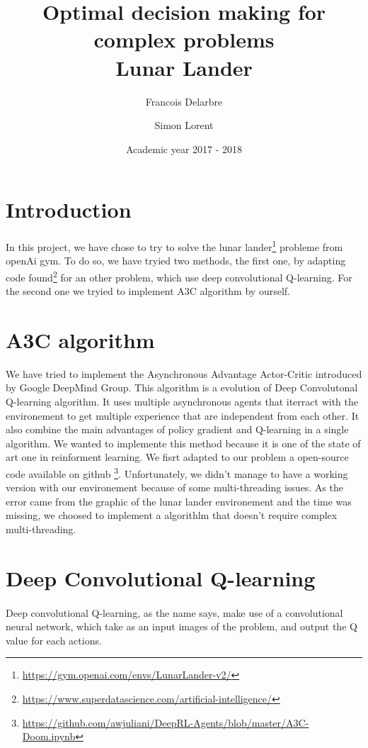 \documentclass[14pt,a4paper,oneside]{report}
\title{\textbf{Optimal decision making for complex problems}
\\ Lunar Lander}
\author{Francois Delarbre \and Simon Lorent}
\begin{document}
\vfill
\date{Academic year 2017 - 2018}

\maketitle

\section{Introduction}
\paragraph{} In this project, we have chose to try to solve the lunar lander\footnote{\url{https://gym.openai.com/envs/LunarLander-v2/}} probleme from openAi gym. To do so, we have tryied two methods, the first one, by adapting code found\footnote{\url{https://www.superdatascience.com/artificial-intelligence/}} for an other problem, which use deep convolutional Q-learning. For the second one we tryied 
	to implement A3C algorithm by ourself. 
	
\section{A3C algorithm}
We have tried to implement the Asynchronous Advantage Actor-Critic introduced by 
Google DeepMind Group. 
This algorithm is a evolution of Deep Convolutonal Q-learning algorithm. It 
uses multiple asynchronous agents that iterract with the environement to get 
multiple experience that are independent from each other.  It also combine 
the main advantages of policy gradient and Q-learning in a single algorithm.
We wanted to implemente this method because it is one of the state of art one 
in reinforment learning.
We fisrt adapted to our problem a open-source code available on github 
\footnote{\url{https://github.com/awjuliani/DeepRL-Agents/blob/master/A3C-Doom.ipynb}}.
Unfortunately, we didn't manage to have a working version with our 
environement because of some multi-threading issues. As the error came from the 
graphic of the lunar lander environement  and the time was missing, we choosed to 
implement a algorithlm that doesn't require complex multi-threading.


\section{Deep Convolutional Q-learning}
\paragraph{} Deep convolutional Q-learning, as the name says, make use of a convolutional neural network, which take as an input images of the problem, and output the Q value for each actions. 
\end{document}
